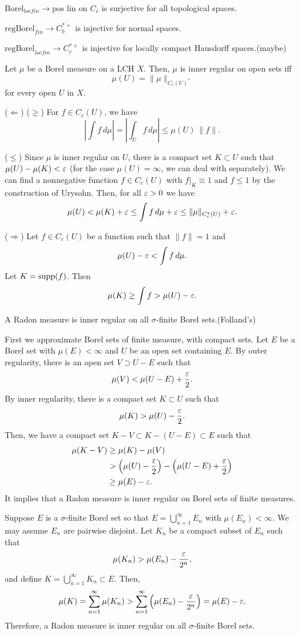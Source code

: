 \documentclass{../../large}
\begin{document}
$\text{Borel}_{locfin}\to \text{pos lin on }C_c$ is surjective for all topological spaces.

$\text{regBorel}_{fin}\to C_b^{*+}$ is injective for normal spaces.

$\text{regBorel}_{locfin}\to C_c^{*+}$ is injective for locally compact Hausdorff spaces.(maybe)

\begin{lem}
Let $\mu$ be a Borel measure on a LCH $X$.
Then, $\mu$ is inner regular on open sets iff
\[\mu(U)=\|\mu\|_{C_c(U)^*}\]
for every open $U$ in $X$.
\end{lem}
\begin{pf}
($\Leftarrow$)
($\ge$)
For $f\in C_c(U)$, we have
\[|\int f\,d\mu|=|\int_Uf\,d\mu|\le\mu(U)\,\|f\|.\]

($\le$)
Since $\mu$ is inner regular on $U$, there is a compact set $K\subset U$ such that $\mu(U)-\mu(K)<\varepsilon$ (for the case $\mu(U)=\infty$, we can deal with separately).
We can find a nonnegative function $f\in C_c(U)$ with $f|_K \equiv 1$ and $f\le1$ by the construction of Urysohn.
Then, for all $\varepsilon>0$ we have
\[\mu(U)<\mu(K)+\varepsilon\le\int f\,d\mu+\varepsilon\le\|\mu\|_{C_c^*(U)}+\varepsilon.\]

($\Rightarrow$)
Let $f\in C_c(U)$ be a function such that $\|f\|=1$ and
\[\mu(U)-\varepsilon<\int f\,d\mu.\]
Let $K=\operatorname{supp}(f)$.
Then
\[\mu(K)\ge\int f>\mu(U)-\varepsilon.\]
\end{pf}

\begin{prop}
A Radon measure is inner regular on all $\sigma$-finite Borel sets.(Folland's)
\end{prop}
\begin{pf}
First we approximate Borel sets of finite measure, with compact sets.
Let $E$ be a Borel set with $\mu(E)<\infty$ and $U$ be an open set containing $E$.
By outer regularity, there is an open set $V\supset U-E$ such that
\[\mu(V)<\mu(U-E)+\frac{\varepsilon}2.\]
By inner regularity, there is a compact set $K\subset U$ such that
\[\mu(K)>\mu(U)-\frac{\varepsilon}2.\]
Then, we have a compact set $K-V\subset K-(U-E)\subset E$ such that
\begin{align*}
\mu(K-V)&\ge\mu(K)-\mu(V)\\
&>\left(\mu(U)-\frac{\varepsilon}2\right)-\left(\mu(U-E)+\frac{\varepsilon}2\right)\\
&\ge\mu(E)-\varepsilon.
\end{align*}
It implies that a Radon measure is inner regular on Borel sets of finite measures.

Suppose $E$ is a $\sigma$-finite Borel set so that $E=\bigcup_{n=1}^\infty E_n$ with $\mu(E_n)<\infty$.
We may assume $E_n$ are pairwise disjoint.
Let $K_n$ be a compact subset of $E_n$ such that
\[\mu(K_n)>\mu(E_n)-\frac{\varepsilon}{2^n},\]
and define $K=\bigcup_{n=1}^\infty K_n\subset E$.
Then,
\[\mu(K)=\sum_{n=1}^\infty\mu(K_n)>\sum_{n=1}^\infty\left(\mu(E_n)-\frac{\varepsilon}{2^n}\right)=\mu(E)-\varepsilon.\]
Therefore, a Radon measure is inner regular on all $\sigma$-finite Borel sets.
\end{pf}
\end{document}

